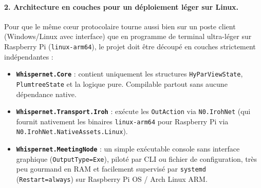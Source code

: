 \documentclass[11pt,a4paper]{article}
\begin{document}
\paragraph{2. Architecture en couches pour un déploiement léger sur Linux.}
Pour que le même cœur protocolaire tourne aussi bien sur un poste client (Windows/Linux avec interface) que en programme de terminal ultra-léger sur Raspberry Pi (\texttt{linux-arm64}), le projet doit être découpé en couches strictement indépendantes :

\begin{center}
\end{center}

\begin{itemize}
    \item \textbf{\texttt{Whispernet.Core}} : contient uniquement les structures \texttt{HyParViewState}, \texttt{PlumtreeState} et la logique pure. Compilable partout sans aucune dépendance native.
    \item \textbf{\texttt{Whispernet.Transport.Iroh}} : exécute les \texttt{OutAction} via \texttt{N0.IrohNet} (qui fournit nativement les binaires \texttt{linux-arm64} pour Raspberry Pi via \texttt{N0.IrohNet.NativeAssets.Linux}).
    \item \textbf{\texttt{Whispernet.MeetingNode}} : un simple exécutable console sans interface graphique (\texttt{OutputType=Exe}), piloté par CLI ou fichier de configuration, très peu gourmand en RAM et facilement supervisé par \texttt{systemd} (\texttt{Restart=always}) sur Raspberry Pi OS / Arch Linux ARM.
\end{itemize}
\end{document}
